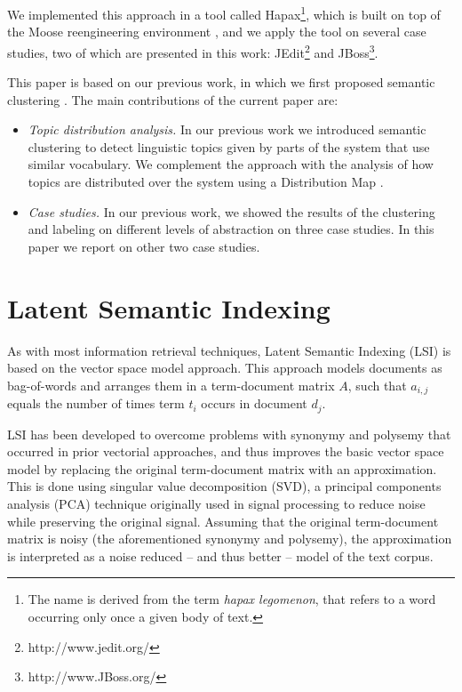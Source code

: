 We implemented this approach in a tool called Hapax\footnote{The name is derived from the term \emph{hapax legomenon}, that refers to a word occurring only once a given body of text.}, which is built on top of the Moose reengineering environment \cite{Duca05a,Nier05c}, and we apply the tool on several case studies, two of which are presented in this work: JEdit\footnote{http://www.jedit.org/} and JBoss\footnote{http://www.JBoss.org/}.

This paper is based on our previous work, in which we first proposed semantic clustering \cite{Kuhn05a}. The main contributions of the current paper are:
\begin{itemize}

\item \emph{Topic distribution analysis.} In our previous work we introduced semantic clustering to detect linguistic topics given by parts of the system that use similar vocabulary. We complement the approach with the analysis of how topics are distributed over the system using a Distribution Map \cite{Duca06c}.

\item \emph{Case studies.} In our previous work, we showed the results of the clustering and labeling on different levels of abstraction on three case studies. In this paper we report on other two case studies.
\end{itemize}

\section{Latent Semantic Indexing}\label{sec:LSI}

As with most information retrieval techniques, Latent Semantic Indexing (LSI) is based on the vector space model approach. This approach models documents as bag-of-words and arranges them in a term-document matrix $A$, such that $a_{i,j}$ equals the number of times term $t_i$ occurs in document $d_j$.

LSI has been developed to overcome problems with synonymy and polysemy that occurred in prior vectorial approaches, and thus improves the basic vector space model by replacing the original term-document matrix with an approximation. This is done using singular value decomposition (SVD), a principal components analysis (PCA) technique originally used in signal processing to reduce noise while preserving the original signal. Assuming that the original term-document matrix is noisy (the aforementioned synonymy and polysemy), the approximation is interpreted as a noise reduced -- and thus better -- model of the text corpus.


